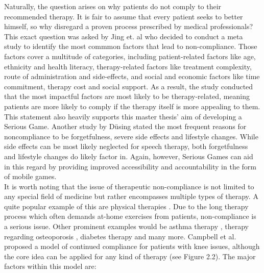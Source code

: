 \documentclass[draft,final]{vutinfth} %
\begin{document}
Naturally, the question arises on why patients do not comply to their recommended therapy. It is fair to assume that every patient seeks to better himself, so why disregard a proven process prescribed by medical professionals? This exact question was asked by Jing et. al \cite{jin2008factors} who decided to conduct a meta study to identify the most commmon factors that lead to non-compliance. Those factors cover a multitude of categories, including patient-related factors like age, ethnicity and health literacy, therapy-related factors like treatment complexity, route of administration and side-effects, and social and economic factors like time commitment, therapy cost and social support. As a result, the study conducted that the most impactful factors are most likely to be therapy-related, meaning patients are more likely to comply if the therapy itself is more appealing to them. This statement also heavily supports this master thesis' aim of developing a Serious Game. 
Another study by Düsing \cite{dusing2001adverse} stated the most frequent reasons for noncompliance to be forgetfulness, severe side effects and lifestyle changes. While side effects can be most likely neglected for speech therapy, both forgetfulness and lifestyle changes do likely factor in. Again, however, Serious Games can aid in this regard by providing improved accessibility and accountability in the form of mobile games. \\
It is worth noting that the issue of therapeutic non-compliance is not limited to any special field of medicine but rather encompasses multiple types of therapy. A quite popular example of this are physical therapies \cite{campbell2001don}. Due to the long therapy process which often demands at-home exercises from patients, non-compliance is a serious issue. Other prominent examples would be asthma therapy \cite{cochrane2000inhaled}, therapy regarding osteoporosis \cite{siris2006adherence}, diabetes therapy \cite{garcia2013adherence} and many more. Campbell et al. \cite{campbell2001don} proposed a model of continued compliance for patients with knee issues, although the core idea can be applied for any kind of therapy (see Figure 2.2). The major factors within this model are:
\end{document}
